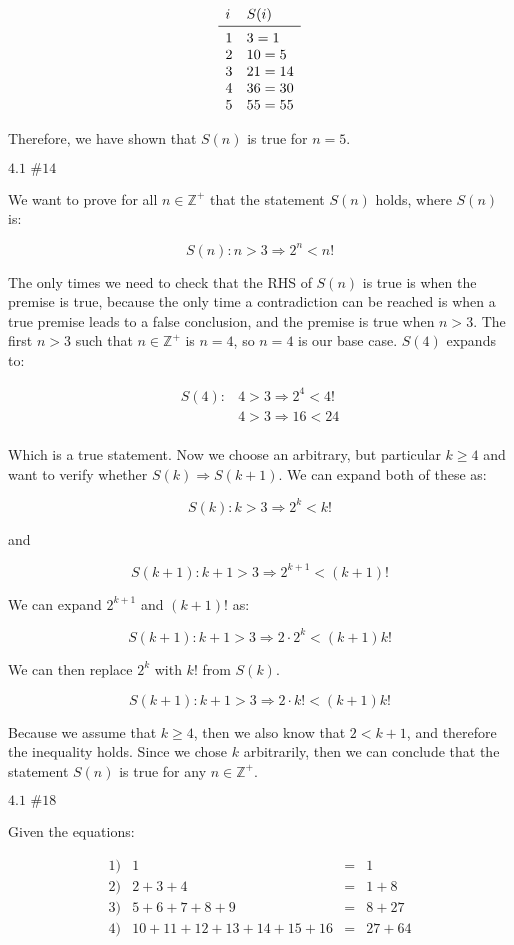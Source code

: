 \documentclass{article}
\newcommand{\problem}[2]{$\boxed{\text{#1 \##2}}$}
\newcommand{\multistep}[1]{\begin{array}{rl} #1 \end{array}}
\begin{document}
\[
\begin{array}{ll}
i & S(i) \\
\midrule
1 & 3=1 \\
2 & 10=5 \\
3 & 21=14 \\
4 & 36=30 \\
5 & 55=55 \\
\end{array}
\]

Therefore, we have shown that $S(n)$ is true for $n=5$.

%
\problem{4.1}{14}

We want to prove for all $n\in\mathbb{Z}^+$ that the statement $S(n)$
holds, where $S(n)$ is:

\[
S(n):n>3\Rightarrow 2^n<n!
\]

The only times we need to check that the RHS of $S(n)$ is true is when
the premise is true, because the only time a contradiction can be
reached is when a true premise leads to a false conclusion, and the
premise is true when $n>3$. The first $n>3$ such that
$n\in\mathbb{Z}^+$ is $n=4$, so $n=4$ is our base case. $S(4)$ expands
to:

\[
\multistep{
S(4):&4>3\Rightarrow 2^4<4! \\
&4>3\Rightarrow 16<24 \\
}
\]

Which is a true statement. Now we choose an arbitrary, but particular
$k\ge4$ and want to verify whether $S(k)\Rightarrow{}S(k+1)$. We can
expand both of these as:

\[
S(k):k>3\Rightarrow 2^k<k!
\]

and

\[
S(k+1):k+1>3\Rightarrow 2^{k+1}<(k+1)!
\]

We can expand $2^{k+1}$ and $(k+1)!$ as:

\[
S(k+1):k+1>3\Rightarrow 2\cdot2^k<(k+1)k!
\]

We can then replace $2^k$ with $k!$ from $S(k)$.

\[
S(k+1):k+1>3\Rightarrow 2\cdot k!<(k+1)k!
\]

Because we assume that $k\ge4$, then we also know that $2<k+1$, and
therefore the inequality holds. Since we chose $k$ arbitrarily, then
we can conclude that the statement $S(n)$ is true for any
$n\in\mathbb{Z}^+$.

%
\problem{4.1}{18}

Given the equations:

\[
\begin{array}{lrcl}
1) & 1&=&1 \\
2) & 2+3+4&=&1+8 \\
3) & 5+6+7+8+9&=&8+27 \\
4) & 10+11+12+13+14+15+16&=&27+64 \\
\end{array}
\]
\end{document}
